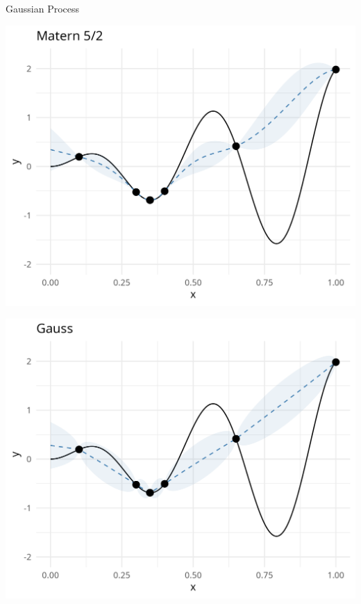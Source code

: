 \documentclass[11pt,compress,t,notes=noshow, xcolor=table]{beamer}
\begin{document}
\begin{vbframe}{Gaussian Process}
\vspace{+0.45cm}

\begin{minipage}[b]{0.45\textwidth}
  \includegraphics[width = \textwidth]{figure_man/surrogate_0.png}
\end{minipage}
\hfill
\begin{minipage}[b]{0.45\textwidth}
  \includegraphics[width = \textwidth]{figure_man/surrogate_1.png}
\end{minipage}

\framebreak


\end{vbframe}
\end{document}
